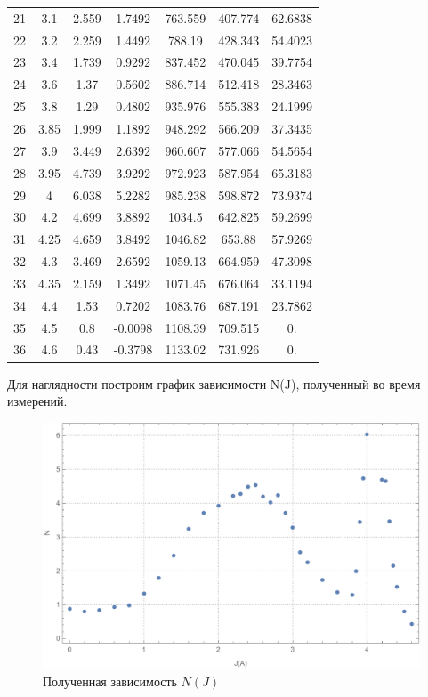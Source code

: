 \documentclass[a4paper, 12pt]{article}
\begin{document}
\begin{table}[!htb]
\begin{tabular}{|c|c|c|c|c|c|c|}
 21 & 3.1 & 2.559 & 1.7492 & 763.559 & 407.774 & 62.6838 \\
 22 & 3.2 & 2.259 & 1.4492 & 788.19 & 428.343 & 54.4023 \\
 23 & 3.4 & 1.739 & 0.9292 & 837.452 & 470.045 & 39.7754 \\
 24 & 3.6 & 1.37 & 0.5602 & 886.714 & 512.418 & 28.3463 \\
 25 & 3.8 & 1.29 & 0.4802 & 935.976 & 555.383 & 24.1999 \\
 26 & 3.85 & 1.999 & 1.1892 & 948.292 & 566.209 & 37.3435 \\
 27 & 3.9 & 3.449 & 2.6392 & 960.607 & 577.066 & 54.5654 \\
 28 & 3.95 & 4.739 & 3.9292 & 972.923 & 587.954 & 65.3183 \\
 29 & 4 & 6.038 & 5.2282 & 985.238 & 598.872 & 73.9374 \\
 30 & 4.2 & 4.699 & 3.8892 & 1034.5 & 642.825 & 59.2699 \\
 31 & 4.25 & 4.659 & 3.8492 & 1046.82 & 653.88 & 57.9269 \\
 32 & 4.3 & 3.469 & 2.6592 & 1059.13 & 664.959 & 47.3098 \\
 33 & 4.35 & 2.159 & 1.3492 & 1071.45 & 676.064 & 33.1194 \\
 34 & 4.4 & 1.53 & 0.7202 & 1083.76 & 687.191 & 23.7862 \\
 35 & 4.5 & 0.8 & -0.0098 & 1108.39 & 709.515 & 0. \\
 36 & 4.6 & 0.43 & -0.3798 & 1133.02 & 731.926 & 0. \\
				\hline
			\end{tabular}
		\end{table}
		\par
		\newpage
		Для наглядности построим график зависимости N(J), полученный во время измерений.
		\begin{figure}[!htb]
			\centering
			\includegraphics[width=\textwidth]{sourcePlot.pdf}
			\caption{Полученная зависимость $N(J)$}
		\end{figure}
\end{document}
